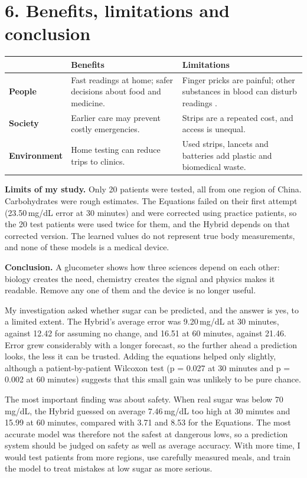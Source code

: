 \documentclass[11pt,a4paper]{article}
\begin{document}
\section*{6. Benefits, limitations and conclusion}

{\small
\noindent\begin{tabular}{@{}>{\bfseries}p{2.4cm}p{6.3cm}p{6.3cm}@{}}
\toprule
& \textbf{Benefits} & \textbf{Limitations}\\
\midrule
People & Fast readings at home; safer decisions about food and medicine. & Finger pricks are painful; other substances in blood can disturb readings \cite{wang}. \\
Society & Earlier care may prevent costly emergencies. & Strips are a repeated cost, and access is unequal. \\
Environment & Home testing can reduce trips to clinics. & Used strips, lancets and batteries add plastic and biomedical waste. \\
\bottomrule
\end{tabular}
}

\textbf{Limits of my study.} Only 20 patients were tested, all from one region of China. Carbohydrates were rough estimates. The Equations failed on their first attempt (23.50\,mg/dL error at 30 minutes) and were corrected using practice patients, so the 20 test patients were used twice for them, and the Hybrid depends on that corrected version. The learned values do not represent true body measurements, and none of these models is a medical device.

\textbf{Conclusion.} A glucometer shows how three sciences depend on each other: biology creates the need, chemistry creates the signal and physics makes it readable. Remove any one of them and the device is no longer useful.

My investigation asked whether sugar can be predicted, and the answer is yes, to a limited extent. The Hybrid's average error was 9.20\,mg/dL at 30 minutes, against 12.42 for assuming no change, and 16.51 at 60 minutes, against 21.46. Error grew considerably with a longer forecast, so the further ahead a prediction looks, the less it can be trusted. Adding the equations helped only slightly, although a patient-by-patient Wilcoxon test (p = 0.027 at 30 minutes and p = 0.002 at 60 minutes) suggests that this small gain was unlikely to be pure chance.

The most important finding was about safety. When real sugar was below 70\,mg/dL, the Hybrid guessed on average 7.46\,mg/dL too high at 30 minutes and 15.99 at 60 minutes, compared with 3.71 and 8.53 for the Equations. The most accurate model was therefore not the safest at dangerous lows, so a prediction system should be judged on safety as well as average accuracy. With more time, I would test patients from more regions, use carefully measured meals, and train the model to treat mistakes at low sugar as more serious.
\end{document}
